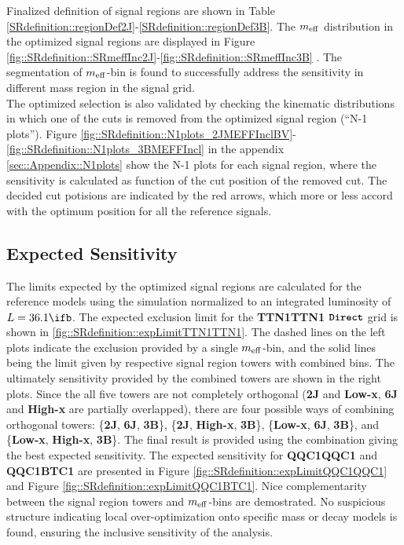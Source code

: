 Finalized definition of signal regions are shown in Table \ref{SRdefinition::regionDef2J}-\ref{SRdefinition::regionDef3B}. The $m_{\mathrm{eff}}$ distribution in the optimized signal regions are displayed in Figure \ref{fig::SRdefinition::SRmeffInc2J}-\ref{fig::SRdefinition::SRmeffInc3B} 
. The segmentation of $m_{\mathrm{eff}}$-bin is found to successfully address the sensitivity in different mass region in the signal grid. \\

The optimized selection is also validated by checking the kinematic distributions in which one of the cuts is removed from the optimized signal region (``N-1 plots''). Figure \ref{fig::SRdefinition::N1plots_2JMEFFInclBV}-\ref{fig::SRdefinition::N1plots_3BMEFFIncl} in the appendix \ref{sec::Appendix::N1plots} show the N-1 plots for each signal region, where the sensitivity is calculated as function of the cut position of the removed cut. The decided cut potisions are indicated by the red arrows, which more or less accord with the optimum position for all the reference signals.









\clearpage				
\subsection{Expected Sensitivity} \label{sec::SRdefinition::expLimit}
The limits expected by the optimized signal regions are calculated for the reference models using the simulation normalized to an integrated luminosity of $L=36.1\ifb$.
The expected exclusion limit for the \textbf{TTN1TTN1} $\mathrm{\textbf{\texttt{Direct}}}$ grid is shown in \ref{fig::SRdefinition::expLimitTTN1TTN1}. 
The dashed lines on the left plots indicate the exclusion provided by a single $m_{\mathrm{eff}}$-bin, and the solid lines being the limit given by respective signal region towers with combined bins. 
The ultimately sensitivity provided by the combined towers are shown in the right plots. 
Since the all five towers are not completely orthogonal (\textbf{2J} and \textbf{Low-x}, \textbf{6J} and \textbf{High-x} are partially overlapped), 
there are four possible ways of combining orthogonal towers: \{\textbf{2J}, \textbf{6J}, \textbf{3B}\}, \{\textbf{2J}, \textbf{High-x}, \textbf{3B}\}, \{\textbf{Low-x}, \textbf{6J}, \textbf{3B}\}, and \{\textbf{Low-x}, \textbf{High-x}, \textbf{3B}\}.
The final result is provided using the combination giving the best expected sensitivity. 
The expected sensitivity for \textbf{QQC1QQC1} and \textbf{QQC1BTC1} are presented in Figure \ref{fig::SRdefinition::expLimitQQC1QQC1} and Figure \ref{fig::SRdefinition::expLimitQQC1BTC1}. Nice complementarity between the signal region towers and $m_{\mathrm{eff}}$-bins are demostrated. 
No suspicious structure indicating local over-optimization onto specific mass or decay models is found, ensuring the inclusive sensitivity of the analysis. 

